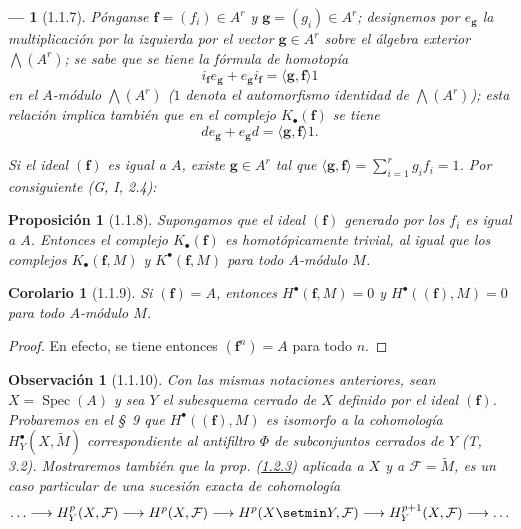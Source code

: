 \documentclass[10pt,oneside,openany]{book}
\theoremstyle{egaenv}\newtheorem*{env}{---}
\theoremstyle{egastatement}
\newtheorem*{proposition}{Proposición}
\newtheorem*{corollary}{Corolario}
\theoremstyle{egadescription}
\newtheorem*{remark}{Observación}
\begin{document}
\begin{env}[1.1.7]
\label{III.1.1.7}
\label{III.1.1.7-fr}
Pónganse $\mathbf f=(f_i)\in A^r$ y $\mathbf g=(g_i)\in A^r$; designemos por $e_{\mathbf g}$ la multiplicación por la izquierda por el vector $\mathbf g\in A^r$ sobre el álgebra exterior $\bigwedge(A^r)$; se sabe que se tiene la \emph{fórmula de homotopía}
\begin{equation}
\label{III.1.1.7.1-fr}
\tag{1.1.7.1}
i_{\mathbf f}e_{\mathbf g}+e_{\mathbf g}i_{\mathbf f}
=\langle\mathbf g,\mathbf f\rangle 1
\end{equation}
en el $A$-módulo $\bigwedge(A^r)$ ($1$ denota el automorfismo identidad de $\bigwedge(A^r)$); esta relación implica también que \emph{en el complejo $K_\bullet(\mathbf f)$} se tiene
\begin{equation}
\label{III.1.1.7.2-fr}
\tag{1.1.7.2}
de_{\mathbf g}+e_{\mathbf g}d=\langle\mathbf g,\mathbf f\rangle 1.
\end{equation}

Si el ideal $(\mathbf f)$ es igual a $A$, existe $\mathbf g\in A^r$ tal que $\langle\mathbf g,\mathbf f\rangle=\sum_{i=1}^r g_if_i=1$.
Por consiguiente (G, I, 2.4):
\end{env}

\begin{proposition}[1.1.8]
\label{III.1.1.8}
\label{III.1.1.8-fr}
Supongamos que el ideal $(\mathbf f)$ generado por los $f_i$ es igual a $A$.
Entonces el complejo $K_\bullet(\mathbf f)$ es homotópicamente trivial, al igual que los complejos $K_\bullet(\mathbf f,M)$ y $K^\bullet(\mathbf f,M)$ para todo $A$-módulo $M$.
\end{proposition}

\begin{corollary}[1.1.9]
\label{III.1.1.9}
\label{III.1.1.9-fr}
Si $(\mathbf f)=A$, entonces $H^\bullet(\mathbf f,M)=0$ y $H^\bullet((\mathbf f),M)=0$ para todo $A$-módulo $M$.
\end{corollary}

\begin{proof}
En efecto, se tiene entonces $(\mathbf f^n)=A$ para todo $n$.
\end{proof}

\begin{remark}[1.1.10]
\label{III.1.1.10}
\label{III.1.1.10-fr}
Con las mismas notaciones anteriores, sean $X=\operatorname{Spec}(A)$ y sea $Y$ el subesquema cerrado de $X$ definido por el ideal $(\mathbf f)$. Probaremos en el \S~9 que $H^\bullet((\mathbf f),M)$ es isomorfo a la cohomología $H_Y^\bullet(X,\widetilde M)$ correspondiente al antifiltro $\Phi$ de subconjuntos cerrados de $Y$ (T, 3.2). Mostraremos también que la prop. (\hyperref[III.1.2.3-fr]{1.2.3}) aplicada a $X$ y a $\mathcal F=\widetilde M$, es un caso particular de una sucesión exacta de cohomología
\[
\ldots\longrightarrow H_Y^p(X,\mathcal F)\longrightarrow H^p(X,\mathcal F)
\longrightarrow H^p(X\setmin Y,\mathcal F)\longrightarrow H_Y^{p+1}(X,\mathcal F)
\longrightarrow\ldots
\]
\end{remark}
\end{document}
